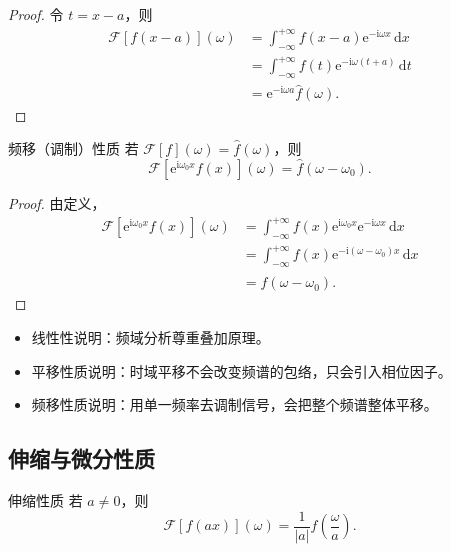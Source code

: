 \begin{proof}
令 $t=x-a$，则
\begin{align}
    \mathcal{F}[f(x-a)](\omega)
    &=
    \int_{-\infty}^{+\infty}f(x-a)\mathrm{e}^{-\mathrm{i}\omega x}\,\mathrm{d}x \\
    &=
    \int_{-\infty}^{+\infty}f(t)\mathrm{e}^{-\mathrm{i}\omega(t+a)}\,\mathrm{d}t \\
    &=
    \mathrm{e}^{-\mathrm{i}\omega a}\hat{f}(\omega).
\end{align}
\end{proof}

\begin{dingli}{频移（调制）性质}{}
若 $\mathcal{F}[f](\omega)=\hat{f}(\omega)$，则
\begin{equation}
    \mathcal{F}\!\left[\mathrm{e}^{\mathrm{i}\omega_0 x}f(x)\right](\omega)
    =
    \hat{f}(\omega-\omega_0).
\end{equation}
\end{dingli}

\begin{proof}
由定义，
\begin{align}
    \mathcal{F}\!\left[\mathrm{e}^{\mathrm{i}\omega_0 x}f(x)\right](\omega)
    &=
    \int_{-\infty}^{+\infty}
    f(x)\mathrm{e}^{\mathrm{i}\omega_0 x}\mathrm{e}^{-\mathrm{i}\omega x}\,\mathrm{d}x \\
    &=
    \int_{-\infty}^{+\infty}
    f(x)\mathrm{e}^{-\mathrm{i}(\omega-\omega_0)x}\,\mathrm{d}x \\
    &=
    \hat{f}(\omega-\omega_0).
\end{align}
\end{proof}

\begin{tishi}[这三条性质的物理直观]
\begin{itemize}
    \item 线性性说明：频域分析尊重叠加原理。
    \item 平移性质说明：时域平移不会改变频谱的包络，只会引入相位因子。
    \item 频移性质说明：用单一频率去调制信号，会把整个频谱整体平移。
\end{itemize}
\end{tishi}

\subsection{伸缩与微分性质}

\begin{dingli}{伸缩性质}{}
若 $a\neq 0$，则
\begin{equation}
    \mathcal{F}[f(ax)](\omega)=\frac{1}{|a|}\hat{f}\!\left(\frac{\omega}{a}\right).
\end{equation}
\end{dingli}

